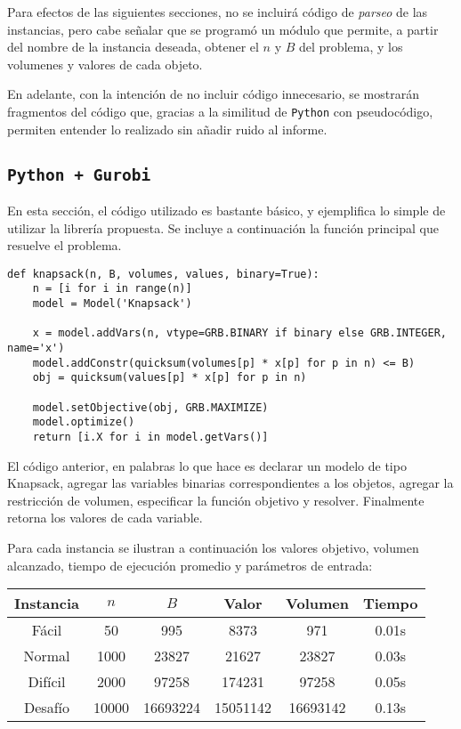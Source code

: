 \documentclass[letterpaper,10pt]{article}
\begin{document}
  Para efectos de las siguientes secciones, no se incluirá código de \textit{parseo} de las instancias, pero cabe señalar que se programó un módulo que permite, a partir del nombre de la instancia deseada, obtener el $n$ y $B$ del problema, y los volumenes y valores de cada objeto.
  
  En adelante, con la intención de no incluir código innecesario, se mostrarán fragmentos del código que, gracias a la similitud de \texttt{Python} con pseudocódigo, permiten entender lo realizado sin añadir ruido al informe.

  \subsection{\texttt{Python + Gurobi}}
  
  En esta sección, el código utilizado es bastante básico, y ejemplifica lo simple de utilizar la librería propuesta. Se incluye a continuación la función principal que resuelve el problema.
  
  \begin{lstlisting}[columns=fullflexible]
  def knapsack(n, B, volumes, values, binary=True):
    n = [i for i in range(n)]
    model = Model('Knapsack')

    x = model.addVars(n, vtype=GRB.BINARY if binary else GRB.INTEGER, name='x')
    model.addConstr(quicksum(volumes[p] * x[p] for p in n) <= B)
    obj = quicksum(values[p] * x[p] for p in n)

    model.setObjective(obj, GRB.MAXIMIZE)
    model.optimize()
    return [i.X for i in model.getVars()]
  \end{lstlisting}
    
  El código anterior, en palabras lo que hace es declarar un modelo de tipo Knapsack, agregar las variables binarias correspondientes a los objetos, agregar la restricción de volumen, especificar la función objetivo y resolver. Finalmente retorna los valores de cada variable.
  
  Para cada instancia se ilustran a continuación los valores objetivo, volumen alcanzado, tiempo de ejecución promedio y parámetros de entrada:
  \begin{center}
    \begin{tabular}{c|c|c|c|c|c}
      Instancia & $n$ & $B$ & Valor & Volumen & Tiempo\\\hline
      Fácil & 50 & 995 & 8373 & 971 & 0.01s\\
      Normal & 1000 & 23827 & 21627 & 23827 & 0.03s\\
      Difícil & 2000 & 97258 & 174231 & 97258 & 0.05s\\
      Desafío & 10000 & 16693224 & 15051142 & 16693142 & 0.13s\\
    \end{tabular}
  \end{center}
    
\end{document}
